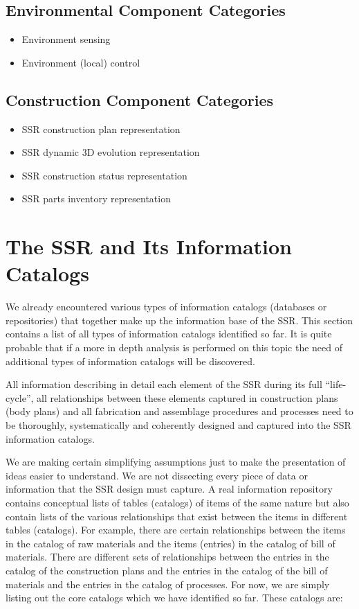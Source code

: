 \subsection{Environmental Component Categories}
\begin{itemize}
\item Environment sensing
\item Environment (local) control
\end{itemize}

\subsection{Construction Component Categories}
\begin{itemize}
\item SSR construction plan representation
\item SSR dynamic 3D evolution representation
\item SSR construction status representation
\item SSR parts inventory representation
\end{itemize}

\section{The SSR and Its Information Catalogs}

We already encountered various types of information catalogs (databases
or repositories) that together make up the information base of the SSR.
This section contains a list of all types of information catalogs
identified so far. It is quite probable that if a more in depth
analysis is performed on this topic the need of additional types of
information catalogs will be discovered.

All information describing in detail each element of the SSR during its
full “life-cycle”, all relationships between these elements captured in
construction plans (body plans) and all fabrication and assemblage
procedures and processes need to be thoroughly, systematically and
coherently designed and captured into the SSR information catalogs.

We are making certain simplifying assumptions just to make the
presentation of ideas easier to understand. We are not dissecting
every piece of data or information that the SSR design must capture.
A real information repository contains
conceptual lists of tables (catalogs) of items of the same nature but
also contain lists of the various relationships that exist between the
items in different tables (catalogs).  For example, there are certain
relationships between the items in the catalog of raw materials and the
items (entries) in the catalog of bill of materials. There are
different sets of relationships between the entries in the catalog of
the construction plans and the entries in the catalog of the bill of
materials and the entries in the catalog of processes.  For now, we are
simply listing out the core catalogs which we have identified so far. 
These catalogs are:

